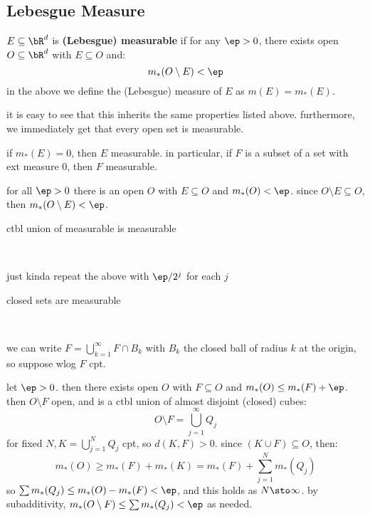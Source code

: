 \subsection{Lebesgue Measure}

\begin{defn}
    $E\subseteq\bR^{d}$ is \textbf{(Lebesgue) measurable} if for any $\ep>0$,
    there exists open $O\subseteq\bR^{d}$ with $E\subseteq O$ and:
    \begin{equation*}
        m_{*}(O\setminus E)<\ep
    \end{equation*}
    in the above we define the (Lebesgue) measure of $E$ as $m(E)=m_{*}(E)$.
\end{defn}

it is easy to see that this inherits the same properties listed above.
furthermore, we immediately get that every open set is measurable.

\begin{prop}
    if $m_{*}(E)=0$, then $E$ measurable. in particular, if $F$ is a subset of a
    set with ext measure 0, then $F$ measurable.
\end{prop}

\begin{pf}[source=Primary Source Material]
    for all $\ep>0$ there is an open $O$ with $E\subseteq O$ and $m_{*}(O)<\ep$.
    since $O\setminus E\subseteq O$, then $m_{*}(O\setminus E)<\ep$.
\end{pf}

\newpage
\begin{prop}
    ctbl union of measurable is measurable
\end{prop} \

\begin{pf}[source=Primary Source Material]
    just kinda repeat the above with $\ep/2^{j}$ for each $j$
\end{pf}

\begin{prop}
    closed sets are measurable
\end{prop} \

\begin{pf}[source=Primary Source Material]
    we can write $F=\bigcup_{k=1}^{\infty}F\cap B_{k}$ with $B_{k}$ the closed
    ball of radius $k$ at the origin, so suppose wlog $F$ cpt.

    let $\ep>0$. then there exists open $O$ with $F\subseteq O$ and
    $m_{*}(O)\leq m_{*}(F)+\ep$. then $O\setminus F$ open, and is a ctbl union
    of almost disjoint (closed) cubes:
    \begin{equation*}
        O\setminus F = \bigcup_{j=1}^{\infty}Q_{j}
    \end{equation*}
    for fixed $N, K=\bigcup_{j=1}^{N}Q_{j}$ cpt, so $d(K,F)>0$.
    since $(K\cup F)\subseteq O$, then:
    \begin{equation*}
        m_{*}(O)\geq m_{*}(F)+m_{*}(K)=m_{*}(F)+\sum_{j=1}^{N}m_{*}(Q_{j})
    \end{equation*}
    so $\sum m_{*}(Q_{j})\leq m_{*}(O)-m_{*}(F)<\ep$, and this holds as
    $N\sto\infty$.
    by subadditivity, $m_{*}(O\setminus F)\leq\sum m_{*}(Q_{j}) <\ep$ as needed.
\end{pf}


